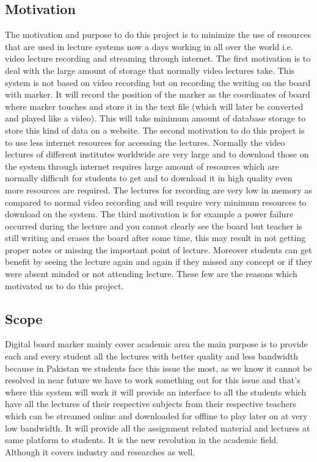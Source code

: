 \documentclass[12pt]{article}
\begin{document}
\subsection{Motivation}
The motivation and purpose to do this project is to minimize the use of resources that are used in lecture systems now a days working in all over the world i.e. video lecture recording and streaming through internet. The first motivation is to deal with the large amount of storage that normally video lectures take. This system is not based on video recording but on recording the writing on the board with marker. It will record the position of the marker as the coordinates of board where marker touches and store it in the text file (which will later be converted and played like a video). This will take minimum amount of database storage to store this kind of data on a website. The second motivation to do this project is to use less internet resources for accessing the lectures. Normally the video lectures of different institutes worldwide are very large and to download those on the system through internet requires large amount of resources which are normally difficult for students to get and to download it in high quality even more resources are required. The lectures for recording are very low in memory as compared to normal video recording and will require very minimum resources to download on the system. The third motivation is for example a power failure occurred during the lecture and you cannot clearly see the board but teacher is still writing and erases the board after some time, this may result in not getting proper notes or missing the important point of lecture. Moreover students can get benefit by seeing the lecture again and again if they missed any concept or if they were absent minded or not attending lecture. These few are the reasons which motivated us to do this project.



\subsection{Scope}
Digital board marker mainly cover academic area the main purpose is to provide each and every student all the lectures with better quality and less bandwidth because in Pakistan we students face this issue the most, as we know it cannot be resolved in near future we have to work something out for this issue and that’s where this system will work it will provide an interface to all the students which have all the lectures of their respective subjects from their respective teachers which can be streamed online and downloaded for offline to play later on at very low bandwidth. It will provide all the assignment related material and lectures at same platform to students. It is the new revolution in the academic field. Although it covers industry and researches as well.
\end{document}
